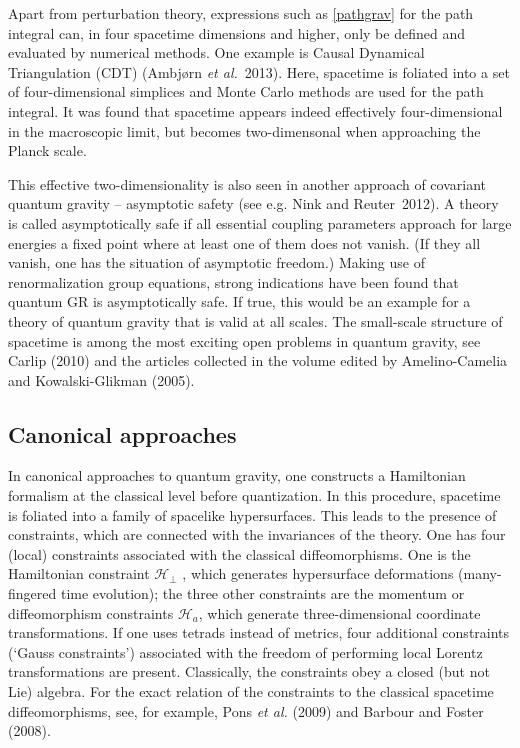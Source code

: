 \documentclass[12pt,a4paper]{article}
\begin{document}
Apart from perturbation theory, expressions such as \eqref{pathgrav}
for the path integral can, in four spacetime dimensions and higher, only be 
defined and evaluated by numerical methods. One example is Causal
Dynamical Triangulation (CDT) (Ambj\o rn {\em et al.}~2013). Here, spacetime
is foliated into a set of four-dimensional simplices
and Monte Carlo methods are used for the path integral. It was found
that spacetime appears indeed effectively four-dimensional in the
macroscopic limit, but becomes two-dimensonal when approaching the
Planck scale.

This effective two-dimensionality is also seen in another approach of
covariant quantum gravity -- asymptotic safety (see e.g. Nink and
Reuter~2012). A theory is called asymptotically safe if all essential
coupling parameters approach for large energies a fixed point where at
least one of them does not vanish. (If they all vanish, one has the
situation of asymptotic freedom.) Making use of renormalization group
equations, strong indications have been found that quantum GR is
asymptotically safe. If true, this would be an example for a theory of
quantum gravity that is valid at all scales.
The small-scale structure of spacetime is among the most exciting open
problems in quantum gravity, see Carlip (2010) and the articles
collected in the volume edited by Amelino-Camelia and
Kowalski-Glikman (2005).  

\subsection{Canonical approaches}


In canonical approaches to quantum gravity, one constructs a
Hamiltonian formalism at the classical level before quantization. 
In this procedure, spacetime is foliated into a family of spacelike
hypersurfaces. This
leads to the presence of constraints, which are connected with the
invariances of the theory. One has four (local) constraints associated
with the classical diffeomorphisms.  One is the
Hamiltonian constraint ${\mathcal H}_{\perp}$ , which generates
hypersurface deformations 
(many-fingered time evolution); the three other constraints are the momentum or
diffeomorphism constraints ${\mathcal H}_a$, 
which generate three-dimensional coordinate transformations. 
If one uses tetrads instead of
metrics, four additional constraints (`Gauss constraints') associated
with the freedom of performing local Lorentz transformations are
present. Classically, the constraints obey a closed (but not Lie) algebra. 
For the exact relation of the constraints to the classical spacetime
diffeomorphisms, see, for example, Pons {\em et al.} (2009) and
Barbour and Foster (2008).
\end{document}
